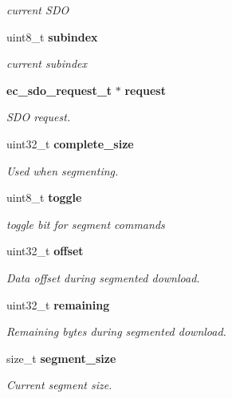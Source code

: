 \begin{DoxyCompactItemize}
\begin{DoxyCompactList}\small\item\em current S\-D\-O \end{DoxyCompactList}\item 
uint8\-\_\-t {\bf subindex}\label{structec__fsm__coe_aafeafb472a372377a5c4822823b831be}

\begin{DoxyCompactList}\small\item\em current subindex \end{DoxyCompactList}\item 
{\bf ec\-\_\-sdo\-\_\-request\-\_\-t} $\ast$ {\bf request}\label{structec__fsm__coe_a039da8218be486849bd275bf1f580e1e}

\begin{DoxyCompactList}\small\item\em S\-D\-O request. \end{DoxyCompactList}\item 
uint32\-\_\-t {\bf complete\-\_\-size}
\begin{DoxyCompactList}\small\item\em Used when segmenting. \end{DoxyCompactList}\item 
uint8\-\_\-t {\bf toggle}\label{structec__fsm__coe_aca395e10ef3f667a25fe05e70ce38d6b}

\begin{DoxyCompactList}\small\item\em toggle bit for segment commands \end{DoxyCompactList}\item 
uint32\-\_\-t {\bf offset}
\begin{DoxyCompactList}\small\item\em Data offset during segmented download. \end{DoxyCompactList}\item 
uint32\-\_\-t {\bf remaining}
\begin{DoxyCompactList}\small\item\em Remaining bytes during segmented download. \end{DoxyCompactList}\item 
size\-\_\-t {\bf segment\-\_\-size}
\begin{DoxyCompactList}\small\item\em Current segment size. \end{DoxyCompactList}\end{DoxyCompactItemize}


